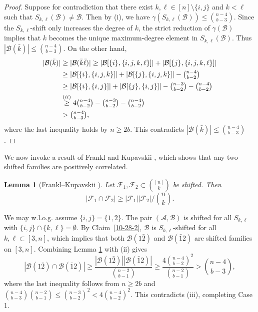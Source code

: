 \documentclass[11pt]{article}
\newcommand{\m}{\mathcal}
\newtheorem{lemma}[theorem]{Lemma}
\begin{document}
\begin{proof}
Suppose for contradiction that there exist $k,\ell\in [n]\setminus \{i,j\}$ and $k<\ell$ such that $S_{k,\ell}(\m B)\ne \m B$. Then by (i), we have 
$\gamma(S_{k, \ell}(\mathcal{B}))\le {n-4\choose b-3}.$
Since the $S_{k,\ell}$-shift only increases the degree of $k$, the strict reduction of $\gamma(\m B)$ implies that  $k$ becomes the unique  maximum-degree element in $S_{k,\ell}(\m B)$. Thus $|\m B(\bar k)|\le {n-4\choose b-3}$.
On the other hand,
\begin{align*}
|\m B(\bar k)|&\ge |\m B(\bar k \bar \ell)|\ge |\m B[\{i\},\{i,j,k,\ell\}]|+|\m B[\{j\},\{i,j,k,\ell\}]|\\
& \ge |\m B[\{i\},\{i,j,k\}]|+|\m B[\{j\},\{i,j,k\}]|-\tbinom{n-4}{b-2}\\
& \ge |\m B[\{i\},\{i,j\}]|+|\m B[\{j\},\{i,j\}]|-\tbinom{n-3}{b-2}-\tbinom{n-4}{b-2}\\
&\overset{(ii)}{\ge}4\tbinom{n-4}{b-2}-\tbinom{n-3}{b-2}-\tbinom{n-4}{b-2}\\
&>\tbinom{n-4}{b-3},
\end{align*}
where the last inequality holds by $n\ge 2b$. This contradicts $|\m B(\bar k)|\le {n-4\choose b-3}$.
\end{proof}

We now invoke a result of Frankl and Kupavskii \cite{FK2021jcta}, which shows that any two shifted families are positively correlated. 
\begin{lemma}[Frankl--Kupavskii \cite{FK2021jcta}]\label{10-28-3}
Let $\mathcal{F}_1, \mathcal{F}_2\subset {[n]\choose k}$ be shifted. Then 
\begin{equation}
|\mathcal{F}_1\cap \mathcal{F}_2|\ge |\mathcal{F}_1| |\mathcal{F}_2|/{n\choose k}.
\end{equation}
\end{lemma}

We may w.l.o.g. assume $\{i,j\}=\{1,2\}$. 
The pair $(\m A, \m B)$ is shifted for all $S_{k,\ell}$ with $\{i, j\}\cap \{k,\ell\}=\emptyset$.
By Claim~\ref{10-28-2}, $\mathcal{B}$ is $S_{k,\ell}$-shifted for all ${k,\ell}\subset[3,n]$, which implies that both $\mathcal{B}(1\bar{2})$ and $\mathcal{B}(\bar{1}2)$ are shifted families on $[3,n]$.
Combining Lemma \ref{10-28-3} with (ii) gives 
\[
|\mathcal{B}(1\bar{2})\cap\mathcal{B}(\bar{1}2)| \ge \frac{|\mathcal{B}(1\bar{2})| |\mathcal{B}(\bar{1}2)|}{\binom{n-2}{b-1}} \ge \frac{4\binom{n-4}{b-2}^2}{\binom{n-2}{b-1}} > \binom{n-4}{b-3},
\]
where the last inequality follows from $n\ge 2b$ and ${n-4\choose b-3}{n-2\choose b-1}\le {n-3\choose b-2}^2<4{n-4\choose b-2}^2$. This contradicts (iii), completing Case 1.
\end{document}
